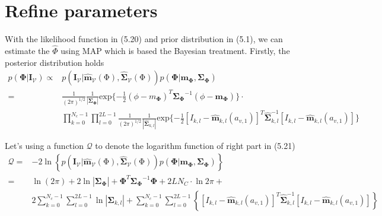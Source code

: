 \section{Refine parameters}
\label{sec:ref}

With the likelihood function in (5.20) and prior distribution in
(5.1), we can estimate the $\hat{\Phi}$ using MAP which is based the
Bayesian treatment.
Firstly, the posterior distribution holds
\begin{align}
    p(\mathbf{\Phi}|\mathbf{\mathbf{I}}_{\mathcal{V}}) 
    \propto &
    p(\mathbf{\mathbf{I}_{\mathcal{V}}}
    |\hat{\mathbf{\mathbf{m}}}_{\mathcal{V}}(\mathrm{\Phi}),\hat{\mathbf{\mathbf{\Sigma}}}_{\mathcal{V}}(\mathrm{\Phi}))p(\mathbf{\Phi}
    | \mathbf{m}_{\mathbf{\Phi}},
    \mathbf{\mathbf{\Sigma}}_{\mathbf{\Phi}})\nonumber\\
    = & {\frac{1}{{(2\pi)}^{1/2}}}
      \frac{1}{|\mathbf{\Sigma}_{\mathbf{\Phi}}|}
      \mathrm{exp}\{-\frac{1}{2}{(\phi-m_{\mathbf{\Phi}})^T{\mathbf{\Sigma}_{\mathbf{\Phi}}}^{-1}(\phi-\mathbf{m}_{\mathbf{\Phi}})}\}\cdot
    \nonumber\\ 
    & \prod_{k = 0}^{N_{c}-1} \prod_{l=0}^{2L-1}{\frac{1}{(2\pi)^{1/2}}
        \frac{1}{|\hat{\mathbf{\Sigma}}_{k,l}|} \mathrm{exp}\{-\frac{1}{2}
        {\left[I_{k,l}-\hat{\mathbf{m}}_{k,l}(a_{v,1})\right]^T\hat{\mathbf{\Sigma}}_{k,l}^{-1}\left[I_{k,l}-\hat{\mathbf{m}}_{k,l}(a_{v,1})\right]}
      }\}
\end{align}

Let's using a function $\mathcal{Q}$ to denote the logarithm function
of right part in (5.21)
\begin{align}
  \label{eq:5.22}
  \mathcal{Q} = & -2 \ln \left\{  p(\mathbf{\mathbf{I}_{\mathcal{V}}}
    |\hat{\mathbf{\mathbf{m}}}_{\mathcal{V}}(\mathrm{\Phi}),\hat{\mathbf{\mathbf{\Sigma}}}_{\mathcal{V}}(\mathrm{\Phi}))p(\mathbf{\Phi}
    | \mathbf{m}_{\mathbf{\Phi}},
    \mathbf{\mathbf{\Sigma}}_{\mathbf{\Phi}})\right\}\nonumber\\
 = & \ln{(2\pi)} + 2\ln{|\mathbf{\Sigma}_{\mathbf{\Phi}}|} +
 {\mathbf{\Phi}}^T{\mathbf{\Sigma}_{\mathbf{\Phi}}}^{-1}\mathbf{\Phi}
 + 2LN_{C} \cdot \ln{2\pi} + \nonumber \\
& 2\sum_{k = 0}^{N_{c}-1} \sum_{l=0}^{2L-1}{\ln{|\mathbf{\Sigma}_{k,l}|}} + \sum_{k = 0}^{N_{c}-1} \sum_{l=0}^{2L-1}
\left\{{\left[I_{k,l}-\hat{\mathbf{m}}_{k,l}(a_{v,1})\right]^T\hat{\mathbf{\Sigma}}_{k,l}^{-1}\left[I_{k,l}-\hat{\mathbf{m}}_{k,l}(a_{v,1})\right]}\right\}
\end{align}

